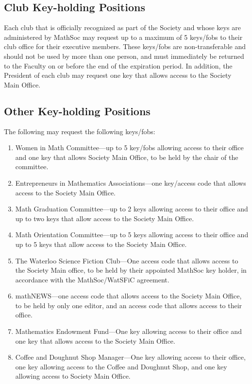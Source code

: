 \subsection{Club Key-holding Positions}
Each club that is officially recognized as part of the Society and whose keys
are administered by MathSoc may request up to a maximum of 5 keys/fobs to their
club office for their executive members. These keys/fobs are non-transferable
and should not be used by more than one person, and must immediately be
returned to the Faculty on or before the end of the expiration period. In
addition, the President of each club may request one key that allows access to
the Society Main Office.

\subsection{Other Key-holding Positions}
The following may request the following keys/fobs:
\begin{enumerate}
  \item Women in Math Committee---up to 5 key/fobs allowing access to their
    office and one key that allows Society Main Office, to be held by the chair
    of the committee.
  \item Entrepreneurs in Mathematics Associations---one key/access code that allows
  access to the Society Main Office. 
  \item Math Graduation Committee---up to 2 keys allowing access to their
    office and up to two keys that allow access to the Society Main Office.
  \item Math Orientation Committee---up to 5 keys allowing access to their
    office and up to 5 keys that allow access to the Society Main Office.
  \item The Waterloo Science Fiction Club---One access code that allows access to the
    Society Main office, to be held by their appointed MathSoc key holder, in
    accordance with the MathSoc/WatSFiC agreement.
  \item mathNEWS---one access code that allows access to the Society Main Office, to be held by only one editor, and an access code that allows access to their office.
  \item Mathematics Endowment Fund---One key allowing access to their office
    and one key that allows access to the Society Main Office.
  \item Coffee and Doughnut Shop Manager---One key allowing access to their
    office, one key allowing access to the Coffee and Doughnut Shop, and one
    key allowing access to Society Main Office.
\end{enumerate}
